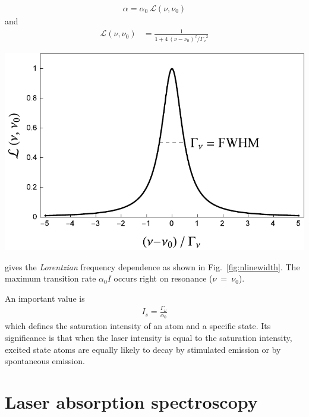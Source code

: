 \begin{minipage}[c][][c]{.45\textwidth}
    \begin{align}\label{eq:alpha}
        \alpha = \alpha_0~\mathcal{L}(\nu,\nu_0)
    \end{align}
    and
    \begin{align}
        \mathcal{L}(\nu,\nu_0) &= \frac{1}{ 1+4~{(\nu-\nu_0)}^2 / {\Gamma_\nu}^2 }
    \end{align}
\end{minipage}
\hfill
\begin{minipage}[c]{.45\textwidth}
    \includegraphics[width=\textwidth]{nLinewidth}
\end{minipage}
\bigskip

gives the \textit{Lorentzian} frequency dependence as shown in Fig.~\ref{fig:nlinewidth}. 
The maximum transition rate \(\alpha_0 I \) occurs right on resonance (\(\nu~=~\nu_0 \)).

An important value is 
\begin{align}
    I_s = \frac{\Gamma_\omega}{\alpha_0} \label{eq:saturationInt}
\end{align}
which defines the saturation intensity of an atom and a specific state. Its 
significance is that when the laser intensity is equal to the saturation intensity, 
excited state atoms are equally likely to decay by stimulated emission or by 
spontaneous emission.

\section{Laser absorption spectroscopy}   %

